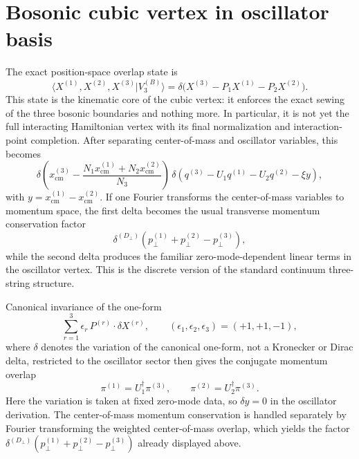\documentclass[11pt]{article}
\numberwithin{equation}{section}
\newcommand{\perpD}{D_\perp}
\begin{document}
\section{Bosonic cubic vertex in oscillator basis}
The exact position-space overlap state is
\begin{equation}
\label{eq:s11-001}
\langle X^{(1)},X^{(2)},X^{(3)}|V_3^{(B)}\rangle
=
\delta\!\bigl(X^{(3)}-P_1X^{(1)}-P_2X^{(2)}\bigr).
\end{equation}
This state is the kinematic core of the cubic vertex: it enforces the exact sewing of the three bosonic boundaries and nothing more. In particular, it is not yet the full interacting Hamiltonian vertex with its final normalization and interaction-point completion.
After separating center-of-mass and oscillator variables, this becomes
\begin{equation}
\label{eq:s11-002}
\delta\!\left(
x_{\mathrm{cm}}^{(3)}-\frac{N_1x_{\mathrm{cm}}^{(1)}+N_2x_{\mathrm{cm}}^{(2)}}{N_3}
\right)
\,
\delta\!\left(q^{(3)}-U_1q^{(1)}-U_2q^{(2)}-\xi y\right),
\end{equation}
with $y=x_{\mathrm{cm}}^{(1)}-x_{\mathrm{cm}}^{(2)}$. If one Fourier transforms the center-of-mass variables to momentum space, the first delta becomes the usual transverse momentum conservation factor
\begin{equation}
\label{eq:s11-003}
\delta^{(\perpD)}\!\left(p_\perp^{(1)}+p_\perp^{(2)}-p_\perp^{(3)}\right),
\end{equation}
while the second delta produces the familiar zero-mode-dependent linear terms in the oscillator vertex. This is the discrete version of the standard continuum three-string structure.

Canonical invariance of the one-form
\begin{equation}
\label{eq:s11-004}
\sum_{r=1}^3 \epsilon_r\, P^{(r)} \cdot \delta X^{(r)},
\qquad
(\epsilon_1,\epsilon_2,\epsilon_3)=(+1,+1,-1),
\end{equation}
where $\delta$ denotes the variation of the canonical one-form, not a Kronecker or Dirac delta,
restricted to the oscillator sector then gives the conjugate momentum overlap
\begin{equation}
\label{eq:s11-005}
\pi^{(1)} = U_1^\dagger \pi^{(3)},
\qquad
\pi^{(2)} = U_2^\dagger \pi^{(3)}.
\end{equation}
Here the variation is taken at fixed zero-mode data, so $\delta y=0$ in the oscillator derivation. The center-of-mass momentum conservation is handled separately by Fourier transforming the weighted center-of-mass overlap, which yields the factor $\delta^{(\perpD)}(p_\perp^{(1)}+p_\perp^{(2)}-p_\perp^{(3)})$ already displayed above.
\end{document}
